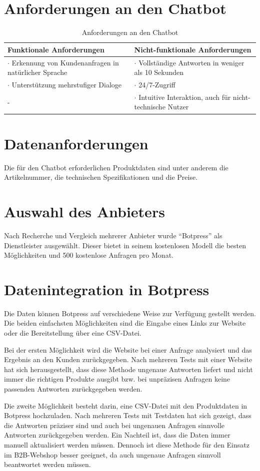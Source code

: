 \documentclass[%
	12pt,
	a4paper,
	oneside,
	parskip=full
]{scrbook}
\begin{document}
\section{Anforderungen an den Chatbot}
\begin{table}[ht]
	\centering
	\begin{tabularx}{\textwidth}{X|X}
		Funktionale Anforderungen&Nicht-funktionale Anforderungen\\ \hline \hline
		$\cdot$ Erkennung von Kundenanfragen in natürlicher Sprache & $\cdot$ Vollständige Antworten in weniger als 10 Sekunden\\
		$\cdot$ Unterstützung mehrstufiger Dialoge & $\cdot$ 24/7-Zugriff\\
		- & $\cdot$ Intuitive Interaktion, auch für nicht-technische Nutzer\\
	\end{tabularx}
	\caption{Anforderungen an den Chatbot}
\end{table}
\section{Datenanforderungen}
Die für den Chatbot erforderlichen Produktdaten sind unter anderem die Artikelnummer, die technischen Spezifikationen und die Preise.
\section{Auswahl des Anbieters}
Nach Recherche und Vergleich mehrerer Anbieter wurde \enquote{Botpress} als Dienstleister ausgewählt. 
Dieser bietet in seinem kostenlosen Modell die besten Möglichkeiten und 500 kostenlose Anfragen pro Monat.
\section{Datenintegration in Botpress}
Die Daten können Botpress auf verschiedene Weise zur Verfügung gestellt werden. 
Die beiden einfachsten Möglichkeiten sind die Eingabe eines Links zur Website oder die Bereitstellung über eine CSV-Datei.

Bei der ersten Möglichkeit wird die Website bei einer Anfrage analysiert und das Ergebnis an den Kunden zurückgegeben. 
Nach mehreren Tests mit einer Website hat sich herausgestellt, dass diese Methode ungenaue Antworten liefert und nicht immer die richtigen Produkte ausgibt bzw. bei unpräzisen Anfragen keine passenden Antworten zurückgegeben werden.

Die zweite Möglichkeit besteht darin, eine CSV-Datei mit den Produktdaten in Botpress hochzuladen. 
Nach mehreren Tests mit Testdaten hat sich gezeigt, dass die Antworten präziser sind und auch bei ungenauen Anfragen sinnvolle Antworten zurückgegeben werden. 
Ein Nachteil ist, dass die Daten immer manuell aktualisiert werden müssen. 
Dennoch ist diese Methode für den Einsatz im B2B-Webshop besser geeignet, da auch ungenaue Anfragen sinnvoll beantwortet werden müssen.  
\end{document}
